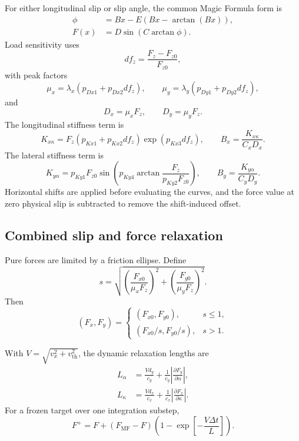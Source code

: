 \documentclass[11pt,a4paper]{article}
\begin{document}
For either longitudinal slip or slip angle, the common Magic Formula form is
\begin{align}
  \phi &= Bx-E\left(Bx-\arctan(Bx)\right),\\
  F(x) &= D\sin\left(C\arctan\phi\right).
\end{align}
Load sensitivity uses
\begin{equation}
  df_z=\frac{F_z-F_{z0}}{F_{z0}},
\end{equation}
with peak factors
\begin{equation}
  \mu_x=\lambda_x(p_{Dx1}+p_{Dx2}df_z),\qquad
  \mu_y=\lambda_y(p_{Dy1}+p_{Dy2}df_z),
\end{equation}
and
\begin{equation}
  D_x=\mu_xF_z,\qquad D_y=\mu_yF_z.
\end{equation}
The longitudinal stiffness term is
\begin{equation}
  K_{x\kappa}=
  F_z(p_{Kx1}+p_{Kx2}df_z)\exp(p_{Kx3}df_z),
  \qquad B_x=\frac{K_{x\kappa}}{C_xD_x}.
\end{equation}
The lateral stiffness term is
\begin{equation}
  K_{y\alpha}=p_{Ky1}F_{z0}
  \sin\left(p_{Ky4}\arctan
  \frac{F_z}{p_{Ky2}F_{z0}}\right),
  \qquad B_y=\frac{K_{y\alpha}}{C_yD_y}.
\end{equation}
Horizontal shifts are applied before evaluating the curves, and the force
value at zero physical slip is subtracted to remove the shift-induced offset.

\subsection{Combined slip and force relaxation}

Pure forces are limited by a friction ellipse. Define
\begin{equation}
  s=\sqrt{
  \left(\frac{F_{x0}}{\mu_xF_z}\right)^2+
  \left(\frac{F_{y0}}{\mu_yF_z}\right)^2}.
\end{equation}
Then
\begin{equation}
  (F_x,F_y)=
  \begin{cases}
  (F_{x0},F_{y0}), & s\leq1,\\
  (F_{x0}/s,F_{y0}/s), & s>1.
  \end{cases}
\end{equation}

With \(V=\sqrt{v_x^2+v_{\mathrm{th}}^2}\), the dynamic relaxation lengths are
\begin{align}
  L_\alpha &= \frac{Vd_y}{c_y}
  +\frac{1}{c_y}\left|\frac{\partial F_y}{\partial\alpha}\right|,\\
  L_\kappa &= \frac{Vd_x}{c_x}
  +\frac{1}{c_x}\left|\frac{\partial F_x}{\partial\kappa}\right|.
\end{align}
For a frozen target over one integration substep,
\begin{equation}
  F^{+}=F+(F_{\mathrm{MF}}-F)
  \left(1-\exp\left[-\frac{V\Delta t}{L}\right]\right).
\end{equation}
\end{document}
